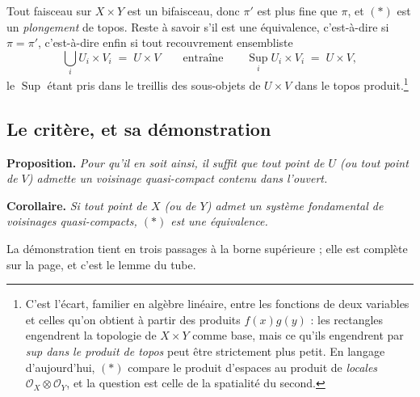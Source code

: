 \documentclass[11pt,a4paper]{article}
\begin{document}
Tout faisceau sur $X \times Y$ est un bifaisceau, donc $\pi'$ est plus fine que
$\pi$, et $(*)$ est un \emph{plongement} de topos. Reste à savoir s'il est une
équivalence, c'est-à-dire si $\pi = \pi'$, c'est-à-dire enfin si tout
recouvrement ensembliste
\[
\bigcup_{i} U_{i} \times V_{i} \;=\; U \times V
\qquad\text{entraîne}\qquad
\operatorname*{Sup}_{i} U_{i} \times V_{i} \;=\; U \times V,
\]
le $\operatorname{Sup}$ étant pris dans le treillis des sous-objets de
$U \times V$ dans le topos produit.\footnote{C'est l'écart, familier
en algèbre linéaire, entre les fonctions de deux variables et celles qu'on
obtient à partir des produits $f(x)g(y)$ : les rectangles engendrent la
topologie de $X \times Y$ comme base, mais ce qu'ils engendrent par
\emph{sup dans le produit de topos} peut être strictement plus petit. En
langage d'aujourd'hui, $(*)$ compare le produit d'espaces au produit de
\emph{locales} $\mathcal{O}_{X} \otimes \mathcal{O}_{Y}$, et la question est
celle de la spatialité du second.}

\subsection*{Le critère, et sa démonstration}

\textbf{Proposition.} \emph{Pour qu'il en soit ainsi, il suffit que tout point
de $U$ (ou tout point de $V$) admette un voisinage quasi-compact contenu dans
l'ouvert.}

\textbf{Corollaire.} \emph{Si tout point de $X$ (ou de $Y$) admet un système
fondamental de voisinages quasi-compacts, $(*)$ est une équivalence.}

La démonstration tient en trois passages à la borne supérieure ; elle est
complète sur la page, et c'est le lemme du tube.
\end{document}
